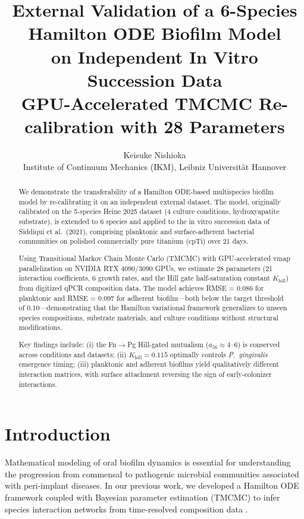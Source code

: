 \documentclass[11pt,a4paper]{article}
\title{External Validation of a 6-Species Hamilton ODE Biofilm Model\\
on Independent In Vitro Succession Data\\[6pt]
\large GPU-Accelerated TMCMC Re-calibration with 28 Parameters}
\author{Keisuke Nishioka\\
\small Institute of Continuum Mechanics (IKM), Leibniz Universit\"at Hannover}
\date{}
\begin{document}
\maketitle

\begin{abstract}
We demonstrate the transferability of a Hamilton ODE-based multispecies biofilm
model by re-calibrating it on an independent external dataset.
The model, originally calibrated on the 5-species Heine 2025 dataset
(4 culture conditions, hydroxyapatite substrate), is extended to 6 species
and applied to the in vitro succession data of Siddiqui et al.\ (2021),
comprising planktonic and surface-adherent bacterial communities on polished
commercially pure titanium (cpTi) over 21 days.

Using Transitional Markov Chain Monte Carlo (TMCMC) with GPU-accelerated
vmap parallelization on NVIDIA RTX 4090/3090 GPUs, we estimate 28 parameters
(21 interaction coefficients, 6 growth rates, and the Hill gate half-saturation
constant $K_\mathrm{hill}$) from digitized qPCR composition data.
The model achieves RMSE = 0.086 for planktonic and RMSE = 0.097 for adherent
biofilm---both below the target threshold of 0.10---demonstrating that the
Hamilton variational framework generalizes to unseen species compositions,
substrate materials, and culture conditions without structural modifications.

Key findings include: (i) the Fn$\to$Pg Hill-gated mutualism ($a_{56} \approx 4$--$6$)
is conserved across conditions and datasets; (ii) $K_\mathrm{hill} = 0.115$
optimally controls \textit{P.\ gingivalis} emergence timing; (iii) planktonic
and adherent biofilms yield qualitatively different interaction matrices,
with surface attachment reversing the sign of early-colonizer interactions.
\end{abstract}

\section{Introduction}

Mathematical modeling of oral biofilm dynamics is essential for understanding
the progression from commensal to pathogenic microbial communities associated
with peri-implant diseases. In our previous work, we developed a Hamilton
ODE framework coupled with Bayesian parameter estimation (TMCMC) to infer
species interaction networks from time-resolved composition data
\cite{heine2025}.
\end{document}
